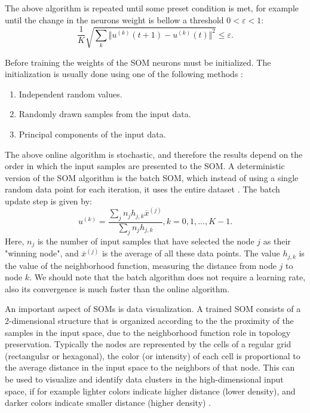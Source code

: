 \documentclass[10pt,english]{article}
\begin{document}
The above algorithm is repeated until some preset condition is met, for example until the change in the neurons weight is bellow a threshold $0<\varepsilon<1$:
\begin{equation}
\frac{1}{K} \sqrt{\sum_k \Vert u^{(k)}(t+1) - u^{(k)}(t) \Vert^2} \leq \varepsilon.
\end{equation}

Before training the weights of the SOM neurons must be initialized. The initialization is usually done using one of the 
following methods \cite{key-5}:
\begin{enumerate}
\item Independent random values.
\item Randomly drawn samples from the input data.
\item Principal components of the input data. 
\end{enumerate}

The above online algorithm is stochastic, and therefore the results depend on the order in which the input samples are presented to the SOM. 
A deterministic version of the SOM algorithm is the batch SOM, which instead of using a single random data point for each iteration, it uses the entire dataset \cite{key-6}. 
The batch update step is given by:
\begin{equation}
u^{(k)} = \frac{\sum_j n_j h_{j,k}\overline{x}^{(j)}}{\sum_j n_j h_{j,k}}, k=0,1,...,K-1.
\end{equation}
Here, $n_j$ is the number of input samples that have selected the node $j$ as their "winning node", and $\overline{x}^{(j)}$ is the average of all these data points. 
The value $h_{j,k}$ is the value of the neighborhood function, measuring the distance from node $j$ to node $k$. We should note that the batch algorithm 
does not require a learning rate, also its convergence is much faster than the online algorithm. 

An important aspect of SOMs is data visualization. A trained SOM consists of a 2-dimensional structure that is organized according to the 
the proximity of the samples in the input space, due to the neighborhood function role in topology preservation. Typically the nodes are 
represented by the cells of a regular grid (rectangular or hexagonal), the color (or intensity) of each cell is proportional to the average distance in the 
input space to the neighbors of that node. This can be used to visualize and identify data clusters in the high-dimensional input space, if for example lighter colors indicate 
higher distance (lower density), and darker colors indicate smaller distance (higher density) \cite{key-5}. 
\end{document}
